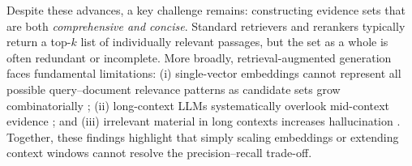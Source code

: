 \documentclass{article} %
\begin{document}



Despite these advances, a key challenge remains: constructing evidence sets that are both \emph{comprehensive and concise}. Standard retrievers and rerankers typically return a top-$k$ list of individually relevant passages, but the set as a whole is often redundant or incomplete. More broadly, retrieval-augmented generation faces fundamental limitations: (i) single-vector embeddings cannot represent all possible query–document relevance patterns as candidate sets grow combinatorially \citep{weller2025theoreticallimitationsembeddingbasedretrieval}; (ii) long-context LLMs systematically overlook mid-context evidence \citep{liu-etal-2024-lost}; and (iii) irrelevant material in long contexts increases hallucination \citep{laban-etal-2024-summary}. Together, these findings highlight that simply scaling embeddings or extending context windows cannot resolve the precision–recall trade-off.
\end{document}
